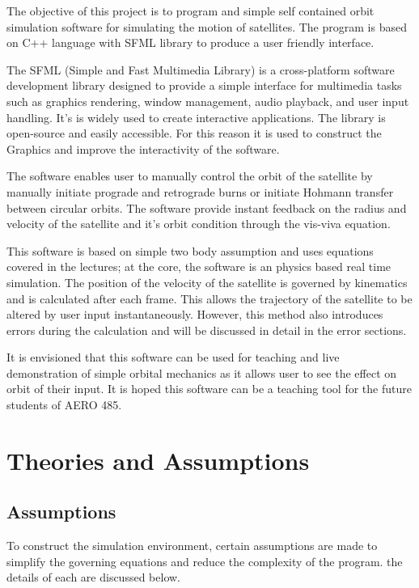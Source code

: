 \documentclass[12pt, letter]{article}
\begin{document}
The objective of this project is to program and simple self contained orbit simulation software for simulating the motion of satellites. The program is based on C++ language with SFML library to produce a user friendly interface.

The SFML (Simple and Fast Multimedia Library) is a cross-platform software development library designed to provide a simple interface for multimedia tasks such as graphics rendering, window management, audio playback, and user input handling. It's is widely used to create interactive applications. The library is open-source and easily accessible. For this reason it is used to construct the Graphics and improve the interactivity of the software.

The software enables user to manually control the orbit of the satellite by manually initiate prograde and retrograde burns or initiate Hohmann transfer between circular orbits. The software provide instant feedback on the radius and velocity of the satellite and it's orbit condition through the vis-viva equation.

This software is based on simple two body assumption and uses equations covered in the lectures; at the core, the software is an physics based real time simulation. The position of the velocity of the satellite is governed by kinematics and is calculated after each frame. This allows the trajectory of the satellite to be altered by user input instantaneously. However, this method also introduces errors during the calculation and will be discussed in detail in the error sections.

It is envisioned that this software can be used for teaching and live demonstration of simple orbital mechanics as it allows user to see the effect on orbit of their input. It is hoped this software can be a teaching tool for the future students of AERO 485. 


\clearpage





\section{Theories and Assumptions}

\subsection{Assumptions}
    To construct the simulation environment, certain assumptions are made to simplify the governing equations and reduce the complexity of the program. the details of each are discussed below.
\end{document}
